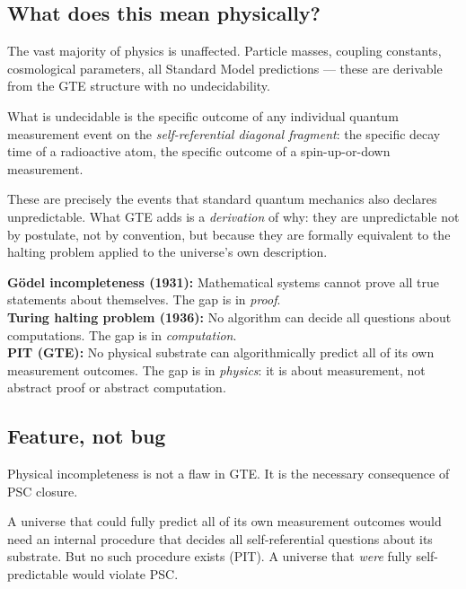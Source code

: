 \documentclass[11pt,a4paper]{article}
\begin{document}
\subsection{What does this mean physically?}

The vast majority of physics is unaffected.  Particle masses, coupling constants,
cosmological parameters, all Standard Model predictions — these are derivable from the
GTE structure with no undecidability.

What is undecidable is the specific outcome of any individual quantum measurement event
on the \emph{self-referential diagonal fragment}: the specific decay time of a
radioactive atom, the specific outcome of a spin-up-or-down measurement.

These are precisely the events that standard quantum mechanics also declares
unpredictable.  What GTE adds is a \emph{derivation} of why: they are unpredictable
not by postulate, not by convention, but because they are formally equivalent to the
halting problem applied to the universe's own description.

\begin{tcolorbox}[colback=boxblue,colframe=blue!40!black,title=PIT vs.\ Gödel and Turing]
\textbf{Gödel incompleteness (1931):} Mathematical systems cannot prove all true
  statements about themselves.  The gap is in \emph{proof}.\\[4pt]
\textbf{Turing halting problem (1936):} No algorithm can decide all questions
  about computations.  The gap is in \emph{computation}.\\[4pt]
\textbf{PIT (GTE):} No physical substrate can algorithmically predict all of its
  own measurement outcomes.  The gap is in \emph{physics}: it is about
  measurement, not abstract proof or abstract computation.
\end{tcolorbox}

\subsection{Feature, not bug}

Physical incompleteness is not a flaw in GTE.  It is the necessary consequence of
PSC closure.

A universe that could fully predict all of its own measurement outcomes would need an
internal procedure that decides all self-referential questions about its substrate.
But no such procedure exists (PIT).  A universe that \emph{were} fully
self-predictable would violate PSC.
\end{document}

